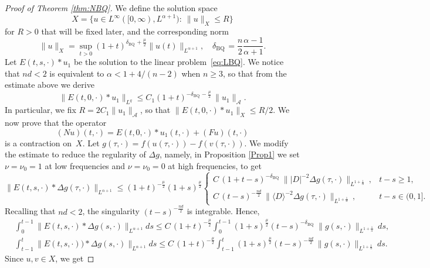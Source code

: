 \documentclass[10pt]{article}
\newcommand{\<}{\langle}
\renewcommand{\>}{\rangle}
\numberwithin{equation}{section}
\newcommand{\BQ}{{\mathrm{BQ\,}}}
\begin{document}
\begin{proof}[Proof of Theorem \ref{thm:NBQ}]
We define the solution space
%
\[  X = \big\{u\in L^\infty([0,\infty), L^{\alpha+1}): \ \|u\|_X\leq R \big\} \]
for $R>0$ that will be fixed later, and the corresponding norm
\[ \|u\|_X = \sup_{t>0} (1+t)^{\delta_\BQ+\frac{\mu}2}\|u(t)\|_{L^{\alpha+1}}, \quad \delta_\BQ=\frac{n}2\frac{\alpha-1}{\alpha+1}. \]
Let $E(t,s, \cdot)\ast u_1$ be the solution to the linear problem~\eqref{eq:LBQ}.
We notice that $nd<2$ is equivalent to $\alpha<1 +4/(n-2)$ when $n\geq3$, so that from the estimate above we derive
\begin{equation*} \label{eq:decayBQ-1}
\|E(t,0, \cdot)\ast u_1\|_{L^q} \leq C_1 (1+t)^{-\delta_\BQ-\frac{\mu}2} \,\|u_1\|_{\mathcal A}.
\end{equation*}
In particular, we fix $R=2C_1\|u_1\|_{\mathcal A}$, so that $\|E(t,0, \cdot)\ast u_1\|_X \leq R/2$. We now prove that the operator
\[ (Nu)(t,\cdot)= E(t,0, \cdot)\ast u_1(t,\cdot) + (Fu)(t,\cdot) \]
is a contraction on~$X$. Let $g(\tau,\cdot)=f(u(\tau,\cdot))-f(v(\tau,\cdot))$. We modify the estimate to reduce the regularity of $\Delta g$, namely, in Proposition \ref{Prop1} we set  $\nu=\nu_0=1$ at low frequencies and   $\nu=\nu_0=0$ at high frequencies, to get
%
\[ \| E(t, s, \cdot)\ast \Delta g(\tau,\cdot)\|_{L^{\alpha+1}} \leq (1+t)^{-\frac{\mu}2}(1+s)^{\frac{\mu}2} \begin{cases}
C\,(1+t-s)^{-\delta_\BQ}\,\||D|^{-2} \Delta g(\tau,\cdot)\|_{L^{1+\frac1\alpha}}\,, & t-s\geq1,\\
C\,(t-s)^{-\frac{nd}2}\,\|\<D\>^{-2} \Delta g(\tau,\cdot)\|_{L^{1+\frac1\alpha}}\,, & t-s\in(0,1].
\end{cases} \]
Recalling that $nd<2$, the singularity $(t-s)^{-\frac{nd}2}$ is integrable. Hence,
%
\[ \begin{split}
& \int_0^{t-1} \| E(t,s, \cdot)\ast \Delta g(s, \cdot)\|_{L^{\alpha+1}} ds \leq C\,(1+t)^{-\frac{\mu}2}\int_0^{t-1} (1+s)^{\frac{\mu}2} (t-s)^{-\delta_\BQ}\,\|g(s,\cdot)\|_{L^{1+\frac1\alpha}}\,ds,\\
& \int_{t-1}^t \| E(t, s, \cdot))\ast \Delta g(s,\cdot)\|_{L^{\alpha+1}} ds \leq C\,(1+t)^{-\frac{\mu}2}\int_{t-1}^t (1+s)^{\frac{\mu}2} (t-s)^{-\frac{nd}2}\,\|g(s,\cdot)\|_{L^{1+\frac1\alpha}}\,ds.
\end{split} \]
%
Since $u,v\in X$, we get

\end{proof}
\end{document}
